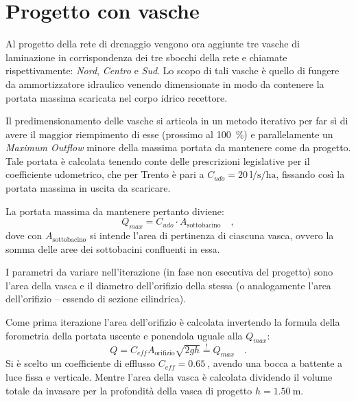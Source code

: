 \clearpage
\section{Progetto con vasche}
Al progetto della rete di drenaggio vengono ora aggiunte tre vasche di laminazione in corrispondenza dei tre sbocchi della rete e chiamate rispettivamente: \emph{Nord}, \emph{Centro} e \emph{Sud}.
Lo scopo di tali vasche è quello di fungere da ammortizzatore idraulico venendo dimensionate in modo da contenere la portata massima scaricata nel corpo idrico recettore.

Il predimensionamento delle vasche si articola in un metodo iterativo per far sì di avere il maggior riempimento di esse (prossimo al \SI{100}{\percent}) e parallelamente un \emph{Maximum Outflow} minore della massima portata da mantenere come da progetto. 
Tale portata è calcolata tenendo conte delle prescrizioni legislative per il coefficiente udometrico, che per Trento è pari a $C_{udo} = \SI{20}{\litre\per\second\per\hectare}$, fissando così la portata massima in uscita da scaricare. 

La portata massima da mantenere pertanto diviene:
\begin{equation}
    \label{eq:qmax}
    Q_{max} = C_{udo} \cdot A_{\text{sottobacino}} \quad ,
\end{equation}
dove con $A_{\text{sottobacino}}$ si intende l'area di pertinenza di ciascuna vasca, ovvero la somma delle aree dei sottobacini confluenti in essa.

I parametri da variare nell'iterazione (in fase non esecutiva del progetto) sono l'area della vasca e il diametro dell'orifizio della stessa (o analogamente l'area dell'orifizio -- essendo di sezione cilindrica). 


Come prima iterazione l'area dell'orifizio è calcolata invertendo la formula della forometria della portata uscente e ponendola uguale alla $Q_{max}$:
\begin{equation}
    Q  = C_{eff} A_{\text{orifizio}} \sqrt{2 g h} \overset{!}{=} Q_{max} \quad .
\end{equation}
Si è scelto un coefficiente di efflusso $C_{eff} = \SI{0.65}{}$, avendo una bocca a battente a luce fissa e verticale. 
Mentre l'area della vasca è calcolata dividendo il volume totale da invasare per la profondità della vasca di progetto $h = \SI{1.50}{\metre}$.

